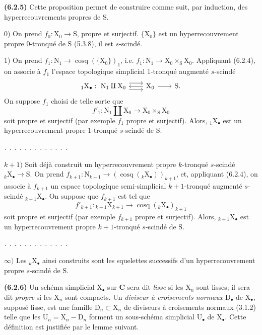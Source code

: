 \documentclass[11pt,leqno]{article}
\begin{document}
\textbf{(6.2.5)} Cette proposition permet de construire comme suit, par induction, des hyperrecouvrements propres de \(\mathrm{S}\).

0) On prend \(f_0:\mathrm{X}_0\to\mathrm{S}\), propre et surjectif. \(\{\mathrm{X}_0\}\) est un hyperrecouvrement propre \(0\)-tronqué de \(\mathrm{S}\) (5.3.8), il est \(s\)-scindé.

1) On prend \(f_1:\mathrm{N}_1\to\operatorname{cosq}(\{\mathrm{X}_0\})_1\), i.e. \(f_1:\mathrm{N}_1\to\mathrm{X}_0\times_{\mathrm{S}}\mathrm{X}_0\). Appliquant (6.2.4), on associe à \(f_1\) l’espace topologique simplicial \(1\)-tronqué augmenté \(s\)-scindé
\[
\begin{tikzcd}[column sep=2em]
{}_{1}\mathrm{X}_{\bullet}:\ \mathrm{N}_1\amalg\mathrm{X}_0
  \arrow[r,shift left=1.1ex]\arrow[r,shift right=1.1ex]
  & \mathrm{X}_0\arrow[l]\arrow[r] & \mathrm{S}.
\end{tikzcd}
\]
On suppose \(f_1\) choisi de telle sorte que
\[
f'_1:\mathrm{N}_1\amalg\mathrm{X}_0
\to\mathrm{X}_0\times_{\mathrm{S}}\mathrm{X}_0
\]
soit propre et surjectif (par exemple \(f_1\) propre et surjectif). Alors, \({}_{1}\mathrm{X}_{\bullet}\) est un hyperrecouvrement propre \(1\)-tronqué \(s\)-scindé de \(\mathrm{S}\).

\noindent\(\ldotp\;\ldotp\;\ldotp\;\ldotp\;\ldotp\;\ldotp\;\ldotp\;\ldotp\;\ldotp\;\ldotp\;\ldotp\;\ldotp\;\ldotp\)

\(k+1)\) Soit déjà construit un hyperrecouvrement propre \(k\)-tronqué \(s\)-scindé \({}_{k}\mathrm{X}_{\bullet}\to\mathrm{S}\). On prend \(f_{k+1}:\mathrm{N}_{k+1}\to(\operatorname{cosq}({}_{k}\mathrm{X}_{\bullet}))_{k+1}\), et, appliquant (6.2.4), on associe à \(f_{k+1}\) un espace topologique semi-simplicial \(k+1\)-tronqué augmenté \(s\)-scindé \({}_{k+1}\mathrm{X}_{\bullet}\). On suppose que \(f_{k+1}\) est tel que
\[
f'_{k+1}:{}_{k+1}\mathrm{X}_{k+1}
\to\operatorname{cosq}({}_{k}\mathrm{X}_{\bullet})_{k+1}
\]
soit propre et surjectif (par exemple \(f_{k+1}\) propre et surjectif). Alors, \({}_{k+1}\mathrm{X}_{\bullet}\) est un hyperrecouvrement propre \(k+1\)-tronqué \(s\)-scindé de \(\mathrm{S}\).

\noindent\(\ldotp\;\ldotp\;\ldotp\;\ldotp\;\ldotp\;\ldotp\;\ldotp\;\ldotp\;\ldotp\;\ldotp\;\ldotp\;\ldotp\;\ldotp\)

\(\infty)\) Les \({}_{k}\mathrm{X}_{\bullet}\) ainsi construits sont les squelettes successifs d’un hyperrecouvrement propre \(s\)-scindé de \(\mathrm{S}\).

\textbf{(6.2.6)} Un schéma simplicial \(\mathrm{X}_{\bullet}\) sur \(\mathbf{C}\) sera dit \textit{lisse} si les \(\mathrm{X}_n\) sont lisses; il sera dit \textit{propre} si les \(\mathrm{X}_n\) sont compacts. Un \textit{diviseur à croisements normaux} \(\mathrm{D}_{\bullet}\) de \(\mathrm{X}_{\bullet}\), supposé lisse, est une famille \(\mathrm{D}_n\subset\mathrm{X}_n\) de diviseurs à croisements normaux (3.1.2) telle que les \(\mathrm{U}_n=\mathrm{X}_n-\mathrm{D}_n\) forment un sous-schéma simplicial \(\mathrm{U}_{\bullet}\) de \(\mathrm{X}_{\bullet}\). Cette définition est justifiée par le lemme suivant.
\end{document}
